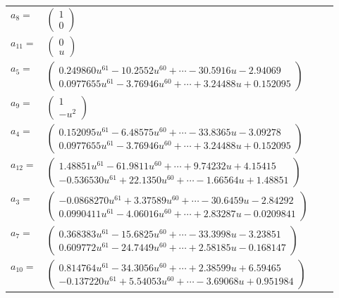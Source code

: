 \documentclass[1p]{elsarticle_modified}
\theoremstyle{definition}
\begin{document}
\begin{tabular}{m{7pt} m{180pt} m{7pt} m{180pt} }
\flushright $a_{8}=$&$\begin{pmatrix}1\\0\end{pmatrix}$ \\
\flushright $a_{11}=$&$\begin{pmatrix}0\\u\end{pmatrix}$ \\
\flushright $a_{5}=$&$\begin{pmatrix}0.249860 u^{61}-10.2552 u^{60}+\cdots-30.5916 u-2.94069\\0.0977655 u^{61}-3.76946 u^{60}+\cdots+3.24488 u+0.152095\end{pmatrix}$ \\
\flushright $a_{9}=$&$\begin{pmatrix}1\\- u^2\end{pmatrix}$ \\
\flushright $a_{4}=$&$\begin{pmatrix}0.152095 u^{61}-6.48575 u^{60}+\cdots-33.8365 u-3.09278\\0.0977655 u^{61}-3.76946 u^{60}+\cdots+3.24488 u+0.152095\end{pmatrix}$ \\
\flushright $a_{12}=$&$\begin{pmatrix}1.48851 u^{61}-61.9811 u^{60}+\cdots+9.74232 u+4.15415\\-0.536530 u^{61}+22.1350 u^{60}+\cdots-1.66564 u+1.48851\end{pmatrix}$ \\
\flushright $a_{3}=$&$\begin{pmatrix}-0.0868270 u^{61}+3.37589 u^{60}+\cdots-30.6459 u-2.84292\\0.0990411 u^{61}-4.06016 u^{60}+\cdots+2.83287 u-0.0209841\end{pmatrix}$ \\
\flushright $a_{7}=$&$\begin{pmatrix}0.368383 u^{61}-15.6825 u^{60}+\cdots-33.3998 u-3.23851\\0.609772 u^{61}-24.7449 u^{60}+\cdots+2.58185 u-0.168147\end{pmatrix}$ \\
\flushright $a_{10}=$&$\begin{pmatrix}0.814764 u^{61}-34.3056 u^{60}+\cdots+2.38599 u+6.59465\\-0.137220 u^{61}+5.54053 u^{60}+\cdots-3.69068 u+0.951984\end{pmatrix}$ \\

\end{tabular}
\end{document}
